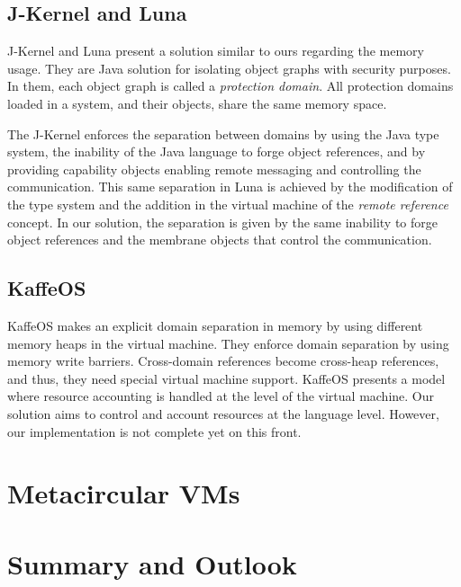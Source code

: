 \subsection*{J-Kernel and Luna}
J-Kernel \cite{Hawb98a} and Luna \cite{Hawb02a} present a solution similar to ours regarding the memory usage. They are Java solution for isolating object graphs with security purposes. In them, each object graph is called a \emph{protection domain}. All protection domains loaded in a system, and their objects, share the same memory space. 

The J-Kernel enforces the separation between domains by using the Java type system, the inability of the Java language to forge object references, and by providing capability objects\cite{Levy84a,Mill03a,Spoo00a} enabling remote messaging and controlling the communication. This same separation in Luna \cite{Hawb02a} is achieved by the modification of the type system and the addition in the virtual machine of the \emph{remote reference} concept. In our solution, the separation is given by the same inability to forge object references and the membrane objects that control the communication.

\subsection*{KaffeOS}
KaffeOS \cite{Back00a} makes an explicit domain separation in memory by using different memory heaps in the virtual machine. They enforce domain separation by using memory write barriers. Cross-domain references become cross-heap references, and thus, they need special virtual machine support.
KaffeOS presents a model where resource accounting is handled at the level of the virtual machine. Our solution aims to control and account resources at the language level. However, our implementation is not complete yet on this front.

\section{Metacircular VMs}

\section{Summary and Outlook}


